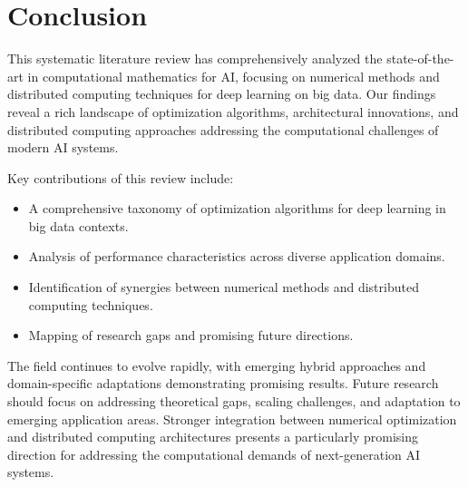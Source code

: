 \section{Conclusion}
This systematic literature review has comprehensively analyzed the state-of-the-art in computational mathematics for AI, focusing on numerical methods and distributed computing techniques for deep learning on big data. Our findings reveal a rich landscape of optimization algorithms, architectural innovations, and distributed computing approaches addressing the computational challenges of modern AI systems.

Key contributions of this review include:
\begin{itemize}
    \item A comprehensive taxonomy of optimization algorithms for deep learning in big data contexts.
    
    \item Analysis of performance characteristics across diverse application domains.
    
    \item Identification of synergies between numerical methods and distributed computing techniques.
    
    \item Mapping of research gaps and promising future directions.
\end{itemize}

The field continues to evolve rapidly, with emerging hybrid approaches and domain-specific adaptations demonstrating promising results. Future research should focus on addressing theoretical gaps, scaling challenges, and adaptation to emerging application areas. Stronger integration between numerical optimization and distributed computing architectures presents a particularly promising direction for addressing the computational demands of next-generation AI systems.
